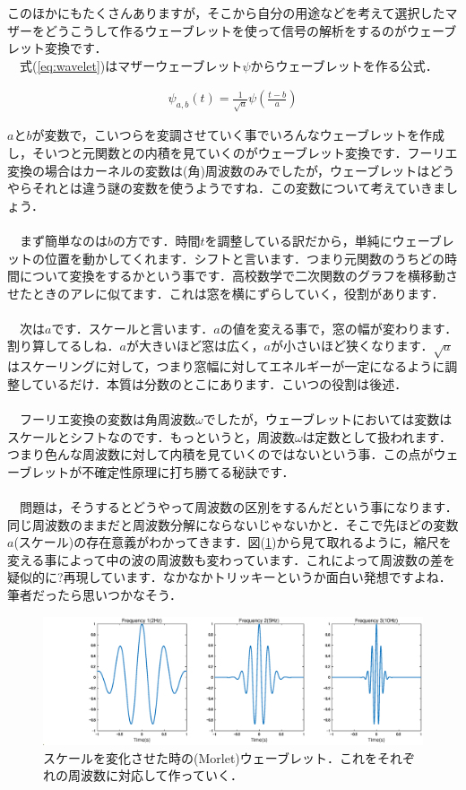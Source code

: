 \documentclass[11pt,a4paper]{ujreport} 	%
\begin{document}
このほかにもたくさんありますが，そこから自分の用途などを考えて選択したマザーをどうこうして作るウェーブレットを使って信号の解析をするのがウェーブレット変換です．\\
　式(\ref{eq:wavelet})はマザーウェーブレット$\psi$からウェーブレットを作る公式．

\begin{eqnarray}
\psi_{a,b}(t)  = \frac{1}{\sqrt{a}}\psi(\frac{t-b}{a})
\label{eq:wavelet}
\end{eqnarray}

$a$と$b$が変数で，こいつらを変調させていく事でいろんなウェーブレットを作成し，そいつと元関数との内積を見ていくのがウェーブレット変換です．フーリエ変換の場合はカーネルの変数は(角)周波数のみでしたが，ウェーブレットはどうやらそれとは違う謎の変数を使うようですね．この変数について考えていきましょう．\\
\\
　まず簡単なのは$b$の方です．時間$t$を調整している訳だから，単純にウェーブレットの位置を動かしてくれます．シフトと言います．つまり元関数のうちどの時間について変換をするかという事です．高校数学で二次関数のグラフを横移動させたときのアレに似てます．これは窓を横にずらしていく，役割があります．\\
\\
　次は$a$です．スケールと言います．$a$の値を変える事で，窓の幅が変わります．割り算してるしね．$a$が大きいほど窓は広く，$a$が小さいほど狭くなります．$\sqrt{a}$はスケーリングに対して，つまり窓幅に対してエネルギーが一定になるように調整しているだけ．本質は分数のとこにあります．こいつの役割は後述．\\
\\
　フーリエ変換の変数は角周波数$\omega$でしたが，ウェーブレットにおいては変数はスケールとシフトなのです．もっというと，周波数$\omega$は定数として扱われます．つまり色んな周波数に対して内積を見ていくのではないという事．この点がウェーブレットが不確定性原理に打ち勝てる秘訣です．\\
\\
　問題は，そうするとどうやって周波数の区別をするんだという事になります．同じ周波数のままだと周波数分解にならないじゃないかと．そこで先ほどの変数$a$(スケール)の存在意義がわかってきます．図(\ref{im:scale})から見て取れるように，縮尺を変える事によって中の波の周波数も変わっています．これによって周波数の差を疑似的に?再現しています．なかなかトリッキーというか面白い発想ですよね．筆者だったら思いつかなそう．

\begin{figure}[H]
  \label{im:scale}
  \centering
  \includegraphics[width=12cm]{../figures/wavelet-scale.eps}
  \caption{スケールを変化させた時の(Morlet)ウェーブレット．これをそれぞれの周波数に対応して作っていく．}
\end{figure}
\end{document}
